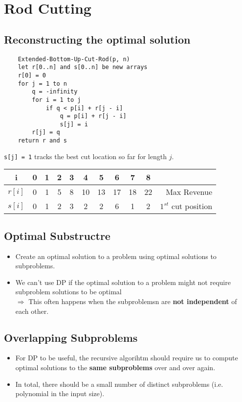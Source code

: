 \documentclass{article}
\begin{document}
\section*{Rod Cutting}
\subsection*{Reconstructing the optimal solution}

\begin{verbatim}
    Extended-Bottom-Up-Cut-Rod(p, n)
    let r[0..n] and s[0..n] be new arrays
    r[0] = 0
    for j = 1 to n
        q = -infinity
        for i = 1 to j
            if q < p[i] + r[j - i]
                q = p[i] + r[j - i]
                s[j] = i
        r[j] = q
    return r and s
\end{verbatim}

\texttt{s[j] = 1} tracks the best cut location so far for length \(j\).

\begin{tabular}{ccccccccccr}
    i        & 0 & 1 & 2 & 3 & 4  & 5  & 6  & 7  & 8                              \\
    \hline
    \(r[i]\) & 0 & 1 & 5 & 8 & 10 & 13 & 17 & 18 & 22 & Max Revenue               \\
    \(s[i]\) & 0 & 1 & 2 & 3 & 2  & 2  & 6  & 1  & 2  & \(1^{{st}}\) cut position \\
\end{tabular}

\subsection*{Optimal Substructre}
\begin{itemize}
    \item Create an optimal solution to a problem using optimal solutions to subproblems.
    \item We can't use DP if the optimal solution to a problem might not require subproblem solutions to be optimal \\
          \(\Rightarrow\) This often happens when the subproblemsn are \textbf{not independent} of each other.
\end{itemize}

\subsection*{Overlapping Subproblems}
\begin{itemize}
    \item For DP to be useful, the recursive algorihtm should require us to compute optimal solutions to the \textbf{same subproblems} over and over again.
    \item In total, there should be a small number of distinct subproblems (i.e. polynomial in the input size).
\end{itemize}
\end{document}
